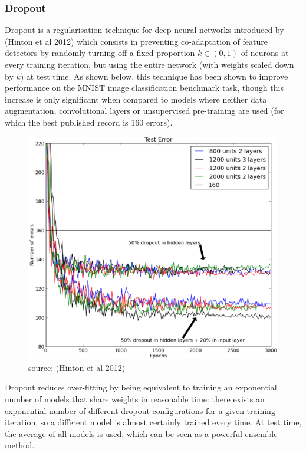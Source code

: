 \documentclass[a4paper,11pt]{article}
\begin{document}
\subsubsection{Dropout}

Dropout is a regularisation technique for deep neural networks introduced by (Hinton et al 2012) \cite{dropout} which consists in preventing co-adaptation of feature detectors by randomly turning off a fixed proportion $k \in (0,1)$ of neurons at every training iteration, but using the entire network (with weights scaled down by $k$) at test time. As shown below, this technique has been shown to improve performance on the MNIST image classification benchmark task, though this increase is only significant when compared to models where neither data augmentation, convolutional layers or unsupervised pre-training are used (for which the best published record is 160 errors). \\

\begin{figure}[h!]
	\centering
	\includegraphics[scale=0.4]{images/dropout.png}
	\caption{source: (Hinton et al 2012)}
\end{figure}

Dropout reduces over-fitting by being equivalent to training an exponential number of models that share weights in reasonable time: there exists an exponential number of different dropout configurations for a given training iteration, so a different model is almost certainly trained every time. At test time, the average of all models is used, which can be seen as a powerful ensemble method. \\
\end{document}
